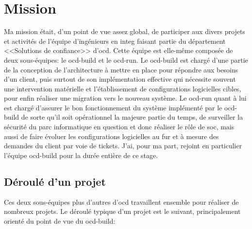 \documentclass[12pt, oneside, a4paper, titlepage]{report}
\begin{document}
\chapter{Mission}%
\label{cha:mission}

Ma mission était, d'un point de vue assez global, de participer aux divers
projets et activités de l'équipe d'ingénieurs en \gls{integ} faisant partie du
département <<Solutions de confiance>> d'\acrlong{ocd}. Cette équipe est
elle-même composée de deux sous-équipes: le \gls{ocd-build} et le \gls{ocd-run}.
Le \gls{ocd-build} est chargé d'une partie de la conception de l'architecture à
mettre en place pour répondre aux besoins d'un client, puis surtout de son
implémentation effective qui nécessite souvent une intervention matérielle et
l'établissement de configurations logicielles cibles, pour enfin réaliser une
migration vers le nouveau système. Le \gls{ocd-run} quant à lui est chargé
d'assurer le bon fonctionnement du système implémenté par le \gls{ocd-build} de
sorte qu'il soit opérationnel la majeure partie du temps, de surveiller la
sécurité du parc informatique en question et donc réaliser le rôle de \gls{soc},
mais aussi de faire évoluer les configurations logicielles au fur et à mesure
des demandes du client par voie de tickets. J'ai, pour ma part, rejoint en
particulier l'équipe \gls{ocd-build} pour la durée entière de ce stage.

\section{Déroulé d'un projet}%
\label{sec:mission::deroule-projet}

Ces deux sous-équipes plus d'autres d'\gls{ocd} travaillent ensemble pour
réaliser de nombreux projets. Le déroulé typique d'un projet est le suivant,
principalement orienté du point de vue du \gls{ocd-build}:
\end{document}
